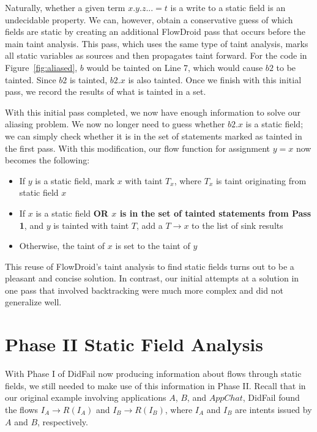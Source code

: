 Naturally, whether a given term $x.y.z... = t$ is a write to a static field is an undecidable property. We can, however, obtain a conservative guess of which fields are static by creating an additional FlowDroid pass that occurs before the main taint analysis. This pass, which uses the same type of taint analysis, marks all static variables as sources and then propagates taint forward. For the code in Figure~\ref{fig:aliased}, $b$ would be tainted on Line 7, which would cause $b2$ to be tainted. Since $b2$ is tainted, $b2.x$ is also tainted. Once we finish with this initial pass, we record the results of what is tainted in a set.

With this initial pass completed, we now have enough information to solve our aliasing problem. We now no longer need to guess whether $b2.x$ is a static field; we can simply check whether it is in the set of statements marked as tainted in the first pass. With this modification, our flow function for assignment $y = x$ now becomes the following:

\begin{itemize}
\item If $y$ is a static field, mark $x$ with taint $T_x$, where $T_x$ is taint originating from static field $x$
\item If $x$ is a static field \textbf{OR $x$ is in the set of tainted statements from Pass 1}, and $y$ is tainted with taint $T$, add a $T\rightarrow x$ to the list of sink results
\item Otherwise, the taint of $x$ is set to the taint of $y$
\end{itemize}

This reuse of FlowDroid's taint analysis to find static fields turns out to be a pleasant and concise solution. In contrast, our initial attempts at a solution in one pass that involved backtracking were much more complex and did not generalize well.

\section{Phase II Static Field Analysis}
\label{sec:staticphase2}

With Phase I of DidFail now producing information about flows through static fields, we still needed to make use of this information in Phase II. Recall that in our original example involving applications $A$, $B$, and $AppChat$, DidFail found the flows $I_A\rightarrow R(I_A)$ and $I_B\rightarrow R(I_B)$, where $I_A$ and $I_B$ are intents issued by $A$ and $B$, respectively. 

